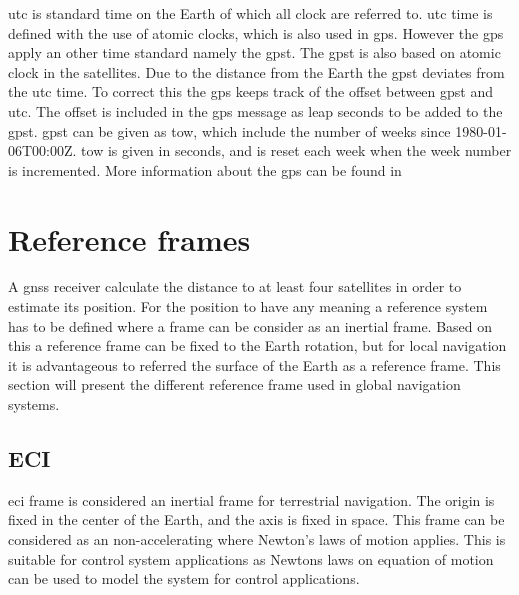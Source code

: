 \gls{utc} is standard time on the Earth of which all clock are referred to. \gls{utc} time is defined with the use of atomic clocks, which is also used in \gls{gps}. However the \gls{gps} apply an other time standard namely the \gls{gpst}. The \gls{gpst} is also based on atomic clock in the satellites. Due to the distance from the Earth the \gls{gpst} deviates from the \gls{utc} time. To correct this the \gls{gps} keeps track of the offset between \gls{gpst} and \gls{utc}. The offset is included in the \gls{gps} message as leap seconds to be added to the \gls{gpst}. \gls{gpst} can be given as \gls{tow}, which include the number of weeks since 1980-01-06T00:00Z. \gls{tow} is given in seconds, and is reset each week when the week number is incremented. More information about the \gls{gps} can be found in \citep{GPSBOOK,vik2014integrated} 

\section{Reference frames}
A \gls{gnss} receiver calculate the distance to at least four satellites in order to estimate its position. For the position to have any meaning a reference system has to be defined where a frame can be consider as an inertial frame. Based on this a reference frame can be fixed to the Earth rotation, but for local navigation it is advantageous to referred the surface of the Earth as a reference frame. This section will present the different reference frame used in global navigation systems.
\subsection{ECI}
\gls{eci} frame is considered an inertial frame for terrestrial navigation. The origin is fixed in the center of the Earth, and the axis is fixed in space. This frame can be considered as an non-accelerating where Newton's laws of motion applies. This is suitable for control system applications as Newtons laws on equation of motion can be used to model the system for control applications.
